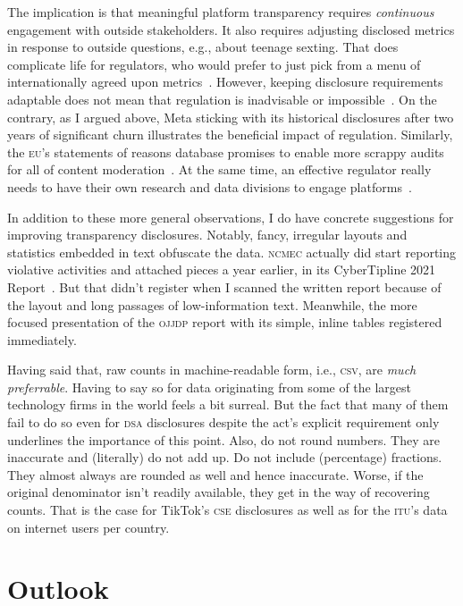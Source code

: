 \documentclass[nonacm,screen]{acmart}
\newcommand\V[1]{\textsc{\MakeLowercase{#1}}}
\begin{document}
The implication is that meaningful platform transparency requires
\emph{continuous} engagement with outside stakeholders. It also requires
adjusting disclosed metrics in response to outside questions, e.g., about
teenage sexting. That does complicate life for regulators, who would prefer to
just pick from a menu of internationally agreed upon
metrics~\cite{HarlingHenesyea2023}. However, keeping disclosure requirements
adaptable does not mean that regulation is inadvisable or
impossible~\cite{Douek2022,Klonick2023}. On the contrary, as I argued above,
Meta sticking with its historical disclosures after two years of significant
churn illustrates the beneficial impact of regulation. Similarly, the \V{EU}'s
statements of reasons database promises to enable more scrappy audits for all of
content moderation~\cite{TrujilloFagniea2024}. At the same time, an effective
regulator really needs to have their own research and data divisions to engage
platforms~\cite{Jaursch2022a,Jaursch2023}.

In addition to these more general observations, I do have concrete suggestions
for improving transparency disclosures. Notably, fancy, irregular layouts and
statistics embedded in text obfuscate the data. \V{NCMEC} actually did start
reporting violative activities and attached pieces a year earlier, in its
CyberTipline 2021 Report~\cite{NcmecCyberTipline2021}. But that didn't register
when I scanned the written report because of the layout and long passages of
low-information text. Meanwhile, the more focused presentation of the \V{OJJDP}
report with its simple, inline tables registered immediately.

Having said that, raw counts in machine-readable form, i.e., \V{CSV}, are
\emph{much preferrable}. Having to say so for data originating from some of the
largest technology firms in the world feels a bit surreal. But the fact that
many of them fail to do so even for \V{DSA} disclosures despite the act's
explicit requirement only underlines the importance of this point. Also, do not
round numbers. They are inaccurate and (literally) do not add up. Do not include
(percentage) fractions. They almost always are rounded as well and hence
inaccurate. Worse, if the original denominator isn't readily available, they get
in the way of recovering counts. That is the case for TikTok's \V{CSE}
disclosures as well as for the \V{ITU}'s data on internet users per country.


\section{Outlook}
\label{sec:outlook}
\end{document}
